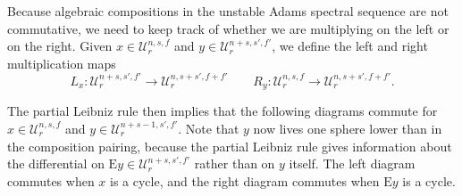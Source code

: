 \documentclass[dvipsnames,table]{amsart}
\theoremstyle{definition}
\theoremstyle{remark}
\numberwithin{equation}{section}
\begin{document}
\noindent Because algebraic compositions in the unstable Adams spectral sequence are not commutative, we need to keep track of whether we are multiplying on the left or on the right. Given $x \in \mathcal{U}_r^{n, s, f}$ and $y \in \mathcal{U}_r^{n + s, s', f'}$, we define the left and right multiplication maps
\begin{equation*}
L_x : \mathcal{U}_r^{n + s, s', f'} \to \mathcal{U}_r^{n, s + s', f + f'} \qquad R_y : \mathcal{U}_r^{n, s, f} \to \mathcal{U}_r^{n, s + s', f + f'}.
\end{equation*}

\noindent The partial Leibniz rule then implies that the following diagrams commute for
\(x \in \mathcal{U}_r^{n, s, f}\) and
\(y \in \mathcal{U}_r^{n+s-1, s', f'}\). Note that $y$ now lives one sphere lower than in the composition pairing, because the partial Leibniz rule gives information about the differential on $\mathrm{E}y \in \mathcal{U}_r^{n+s, s', f'}$ rather than on $y$ itself. The left diagram commutes when $x$ is a cycle, and the right diagram commutes when $\mathrm{E}y$ is a cycle.

\begin{center}
\end{center}
\end{document}
